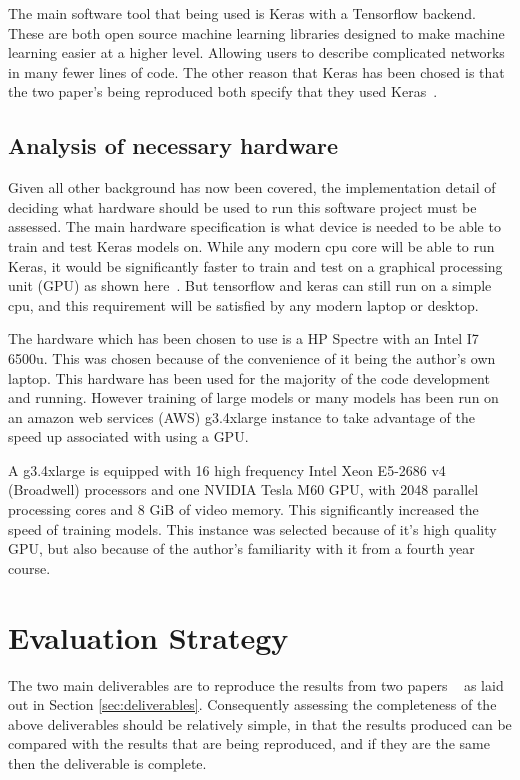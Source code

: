 \documentclass[12pt,onecolumn,letterpaper]{article}
\begin{document}
The main software tool that being used is Keras with a Tensorflow backend. These are both open source machine learning libraries designed to make machine learning easier at a higher level. Allowing users to describe complicated networks in many fewer lines of code. The other reason that Keras has been chosed is that the two paper's being reproduced both specify that they used Keras~\cite{oShea,Aoudia}. 

\subsection{Analysis of necessary hardware}
\label{sec:HardwareAnalysis}

Given all other background has now been covered, the implementation detail of deciding what hardware should be used to run this software project must be assessed. The main hardware specification is what device is needed to be able to train and test Keras models on. While any modern cpu core will be able to run Keras, it would be significantly faster to train and test on a graphical processing unit (GPU) as shown here~\cite{TensorflowBenchmarking}. But tensorflow and keras can still run on a simple cpu, and this requirement will be satisfied by any modern laptop or desktop. 

The hardware which has been chosen to use is a HP Spectre with an Intel I7 6500u. This was chosen because of the convenience of it being the author's own laptop. This hardware has been used for the majority of the code development and running. However training of large models or many models has been run on an amazon web services (AWS) g3.4xlarge instance to take advantage of the speed up associated with using a GPU.

A g3.4xlarge is equipped with 16 high frequency Intel Xeon E5-2686 v4 (Broadwell) processors and one NVIDIA Tesla M60 GPU, with 2048 parallel processing cores and 8 GiB of video memory. This significantly increased the speed of training models. This instance was selected because of it's high quality GPU, but also because of the author's familiarity with it from a fourth year course.

\FloatBarrier
\section{Evaluation Strategy}

The two main deliverables are to reproduce the results from two papers ~\cite{oShea,Aoudia} as laid out in Section \ref{sec:deliverables}. Consequently assessing the completeness of the above deliverables should be relatively simple, in that the results produced can be compared with the results that are being reproduced, and if they are the same then the deliverable is complete.
\end{document}
